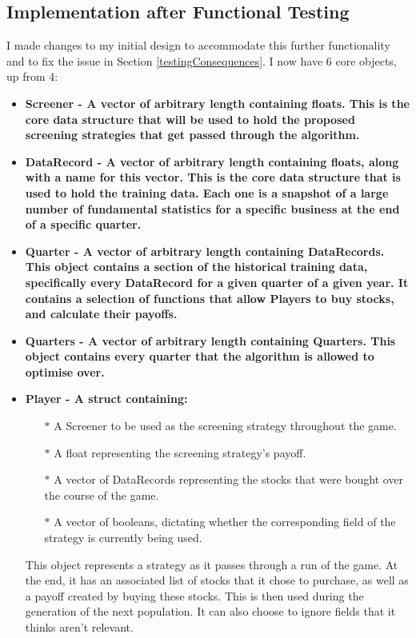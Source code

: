 \subsection{Implementation after Functional Testing}
I made changes to my initial design to accommodate this further functionality and to fix the issue in Section \ref{testingConsequences}. I now have 6 core objects, up from 4:
\begin{itemize}
    \item \bf Screener \rm - A vector of arbitrary length containing floats. This is the core data structure that will be used to hold the proposed screening strategies that get passed through the algorithm.
    \item \bf DataRecord \rm - A vector of arbitrary length containing floats, along with a name for this vector. This is the core data structure that is used to hold the training data. Each one is a snapshot of a large number of fundamental statistics for a specific business at the end of a specific quarter.
    \item \bf Quarter \rm - A vector of arbitrary length containing DataRecords. This object contains a section of the historical training data, specifically every DataRecord for a given quarter of a given year. It contains a selection of functions that allow Players to buy stocks, and calculate their payoffs.
    \item \bf Quarters \rm - A vector of arbitrary length containing Quarters. This object contains every quarter that the algorithm is allowed to optimise over.
    \item \bf Player \rm - A struct containing:
    \begin{itemize}
        \item[$\ast$] A Screener to be used as the screening strategy throughout the game.
        \item[$\ast$] A float representing the screening strategy's payoff.
        \item[$\ast$] A vector of DataRecords representing the stocks that were bought over the course of the game.
        \item[$\ast$] A vector of booleans, dictating whether the corresponding field of the strategy is currently being used.
    \end{itemize}
    This object represents a strategy as it passes through a run of the game. At the end, it has an associated list of stocks that it chose to purchase, as well as a payoff created by buying these stocks. This is then used during the generation of the next population. It can also choose to ignore fields that it thinks aren't relevant.

\end{itemize}
